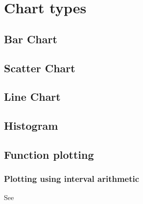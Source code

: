 \chapter{Chart types}

\section{Bar Chart}

\section{Scatter Chart}

\section{Line Chart}

\section{Histogram}

\section{Function plotting}

\subsection{Plotting using interval arithmetic}
See \cite{shou05}
